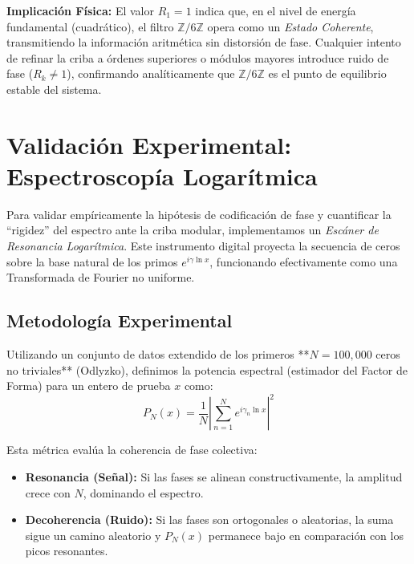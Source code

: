 \documentclass[12pt, a4paper]{article}
\theoremstyle{plain}
\theoremstyle{definition}
\newcommand{\Z}{\mathbb{Z}}
\begin{document}
\textbf{Implicación Física:} El valor $R_1=1$ indica que, en el nivel de energía fundamental (cuadrático), el filtro $\Z/6\Z$ opera como un \emph{Estado Coherente}, transmitiendo la información aritmética sin distorsión de fase. Cualquier intento de refinar la criba a órdenes superiores o módulos mayores introduce ruido de fase ($R_k \neq 1$), confirmando analíticamente que $\Z/6\Z$ es el punto de equilibrio estable del sistema.


\section{Validación Experimental: Espectroscopía Logarítmica}

Para validar empíricamente la hipótesis de codificación de fase y cuantificar la ``rigidez'' del espectro ante la criba modular, implementamos un \emph{Escáner de Resonancia Logarítmica}. Este instrumento digital proyecta la secuencia de ceros sobre la base natural de los primos $e^{i\gamma \ln x}$, funcionando efectivamente como una Transformada de Fourier no uniforme.

\subsection{Metodología Experimental}

Utilizando un conjunto de datos extendido de los primeros **$N=100,000$ ceros no triviales** (Odlyzko), definimos la potencia espectral (estimador del Factor de Forma) para un entero de prueba $x$ como:
\begin{equation}
    P_N(x) = \frac{1}{N} \left| \sum_{n=1}^N e^{i \gamma_n \ln x} \right|^2
\end{equation}

Esta métrica evalúa la coherencia de fase colectiva:
\begin{itemize}
    \item \textbf{Resonancia (Señal):} Si las fases se alinean constructivamente, la amplitud crece con $N$, dominando el espectro.
    \item \textbf{Decoherencia (Ruido):} Si las fases son ortogonales o aleatorias, la suma sigue un camino aleatorio y $P_N(x)$ permanece bajo en comparación con los picos resonantes.
\end{itemize}
\end{document}
